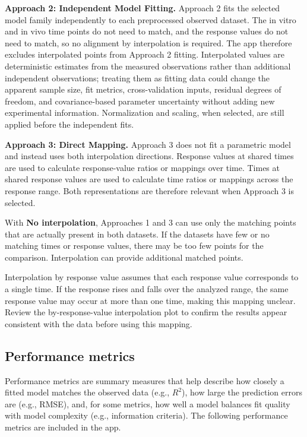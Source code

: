 \textbf{Approach 2: Independent Model Fitting.} Approach 2 fits the selected model family independently to each preprocessed observed dataset. The in vitro and in vivo time points do not need to match, and the response values do not need to match, so no alignment by interpolation is required. The app therefore excludes interpolated points from Approach 2 fitting. Interpolated values are deterministic estimates from the measured observations rather than additional independent observations; treating them as fitting data could change the apparent sample size, fit metrics, cross-validation inputs, residual degrees of freedom, and covariance-based parameter uncertainty without adding new experimental information. Normalization and scaling, when selected, are still applied before the independent fits.

\textbf{Approach 3: Direct Mapping.} Approach 3 does not fit a parametric model and instead uses both interpolation directions. Response values at shared times are used to calculate response-value ratios or mappings over time. Times at shared response values are used to calculate time ratios or mappings across the response range. Both representations are therefore relevant when Approach 3 is selected.

With \textbf{No interpolation}, Approaches 1 and 3 can use only the matching points that are actually present in both datasets. If the datasets have few or no matching times or response values, there may be too few points for the comparison. Interpolation can provide additional matched points. 

Interpolation by response value assumes that each response value corresponds to a single time. If the response rises and falls over the analyzed range, the same response value may occur at more than one time, making this mapping unclear. Review the by-response-value interpolation plot to confirm the results appear consistent with the data before using this mapping.

\subsection{Performance metrics}

Performance metrics are summary measures that help describe how closely a fitted model matches the observed data (e.g., $R^2$), how large the prediction errors are (e.g., RMSE), and, for some metrics, how well a model balances fit quality with model complexity (e.g., information criteria). The following performance metrics are included in the app.


